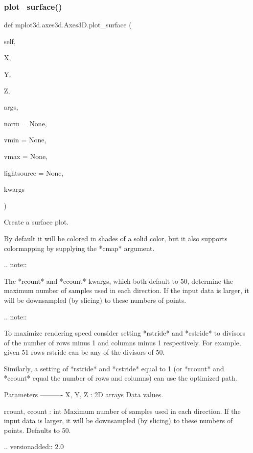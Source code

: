 \begin{DoxyVerb}
\subsubsection{\texorpdfstring{plot\+\_\+surface()}{plot\_surface()}}
{\footnotesize\ttfamily def mplot3d.\+axes3d.\+Axes3\+D.\+plot\+\_\+surface (\begin{DoxyParamCaption}\item[{}]{self,  }\item[{}]{X,  }\item[{}]{Y,  }\item[{}]{Z,  }\item[{}]{args,  }\item[{}]{norm = {\ttfamily None},  }\item[{}]{vmin = {\ttfamily None},  }\item[{}]{vmax = {\ttfamily None},  }\item[{}]{lightsource = {\ttfamily None},  }\item[{}]{kwargs }\end{DoxyParamCaption})}

\begin{DoxyVerb}Create a surface plot.

By default it will be colored in shades of a solid color, but it also
supports colormapping by supplying the *cmap* argument.

.. note::

   The *rcount* and *ccount* kwargs, which both default to 50,
   determine the maximum number of samples used in each direction.  If
   the input data is larger, it will be downsampled (by slicing) to
   these numbers of points.

.. note::

   To maximize rendering speed consider setting *rstride* and *cstride*
   to divisors of the number of rows minus 1 and columns minus 1
   respectively. For example, given 51 rows rstride can be any of the
   divisors of 50.

   Similarly, a setting of *rstride* and *cstride* equal to 1 (or
   *rcount* and *ccount* equal the number of rows and columns) can use
   the optimized path.

Parameters
----------
X, Y, Z : 2D arrays
    Data values.

rcount, ccount : int
    Maximum number of samples used in each direction.  If the input
    data is larger, it will be downsampled (by slicing) to these
    numbers of points.  Defaults to 50.

    .. versionadded:: 2.0


\end{DoxyVerb}
\end{DoxyVerb}

